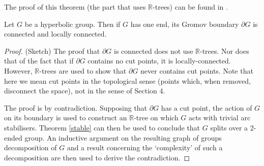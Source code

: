 The proof of this theorem (the part that uses $\mathbb{R}$-trees) can be found in \cite{S96}.
\begin{theorem}
\label{twinning}
    Let $G$ be a hyperbolic group. Then if $G$ has one end, its Gromov boundary $\partial G$ is connected and locally connected.
\end{theorem}

\begin{proof}
    (Sketch) The proof that $\partial G$ is connected does not use $\mathbb{R}$-trees. Nor does that of the fact that if $\partial G$ contains no cut points, it is locally-connected. However, $\mathbb{R}$-trees are used to show that $\partial G$ never contains cut points. Note that here we mean cut points in the topological sense (points which, when removed, disconnect the space), not in the sense of Section 4.
    
    The proof is by contradiction. Supposing that $\partial G$ has a cut point, the action of $G$ on its boundary is used to construct an $\mathbb{R}$-tree on which $G$ acts with trivial arc stabilisers. Theorem \ref{stable} can then be used to conclude that $G$ splits over a 2-ended group. An inductive argument on the resulting graph of groups decomposition of $G$ and a result concerning the `complexity' of such a decomposition are then used to derive the contradiction.
\end{proof}










